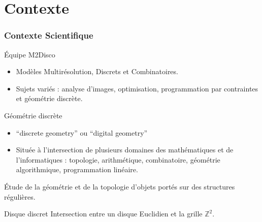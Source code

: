 \section{Contexte}

\begin{frame}
\frametitle{Contexte Scientifique}
\begin{block}{Équipe M2Disco}
  \begin{itemize}
    \item Modèles Multirésolution, Discrets et Combinatoires.
    \item Sujets variés : analyse d'images, optimisation, programmation par contraintes et \alert{géométrie discrète}.
  \end{itemize}
\end{block}   

\begin{block}{Géométrie discrète}
  \begin{itemize}
    \item ``discrete geometry'' ou ``digital geometry''
    \item Située à l'intersection de plusieurs domaines des mathématiques et de l'informatiques : topologie, arithmétique, combinatoire, géométrie algorithmique, programmation linéaire. \\
  \end{itemize} 
  Étude de la géométrie et de la topologie d'objets portés sur des structures régulières.\\ 
\end{block}   

\begin{alertblock}{Disque discret}
  Intersection entre un disque Euclidien et la grille $\mathbb{Z}^{2}$. 
\end{alertblock}
\end{frame}

